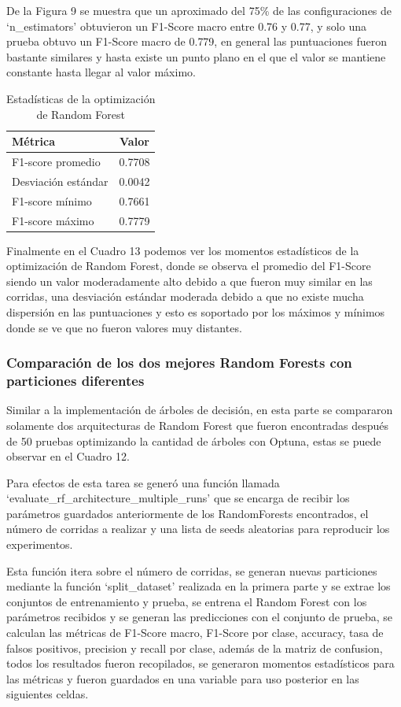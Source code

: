 \documentclass[12pt,a4paper]{article}
\begin{document}
De la Figura 9 se muestra que un aproximado del 75\% de las configuraciones de `n_estimators'
obtuvieron un F1-Score macro entre 0.76 y 0.77, y solo una prueba obtuvo un F1-Score macro de 0.779, en general
las puntuaciones fueron bastante similares y hasta existe un punto plano en el que el valor se mantiene constante
hasta llegar al valor máximo.

\begin{table}[H]
  \centering
  \begin{tabular}{lc}
    \hline
    Métrica & Valor \\
    \hline
    F1-score promedio & 0.7708 \\
    Desviación estándar & 0.0042 \\
    F1-score mínimo & 0.7661 \\
    F1-score máximo & 0.7779 \\
    \hline
  \end{tabular}
  \caption{Estadísticas de la optimización de Random Forest}
  \label{tab:rf-opt-stats}
\end{table}

Finalmente en el Cuadro 13 podemos ver los momentos estadísticos de la optimización de Random Forest,
donde se observa el promedio del F1-Score siendo un valor moderadamente alto debido a que fueron muy similar en las corridas,
una desviación estándar moderada debido a que no existe mucha dispersión en las puntuaciones y esto es soportado
por los máximos y mínimos donde se ve que no fueron valores muy distantes.

\subsubsection{Comparación de los dos mejores Random Forests con particiones diferentes}

Similar a la implementación de árboles de decisión, en esta parte se compararon solamente dos arquitecturas de
Random Forest que fueron encontradas después de 50 pruebas optimizando la cantidad de árboles con Optuna, estas se
puede observar en el Cuadro 12.

Para efectos de esta tarea se generó una función llamada `evaluate_rf_architecture_multiple_runs' que se encarga de recibir
los parámetros guardados anteriormente de los RandomForests encontrados, el número de corridas a realizar y una lista de seeds aleatorias
para reproducir los experimentos.

Esta función itera sobre el número de corridas, se generan nuevas particiones mediante la función `split_dataset' realizada en la
primera parte y se extrae los conjuntos de entrenamiento y prueba, se entrena el Random Forest con los parámetros recibidos
y se generan las predicciones con el conjunto de prueba, se calculan las métricas de F1-Score macro, F1-Score por clase, accuracy, tasa de
falsos positivos, precision y recall por clase, además de la matriz de confusion, todos los resultados fueron recopilados,
se generaron momentos estadísticos para las métricas y fueron guardados en una variable para uso posterior en las siguientes celdas.
\end{document}
